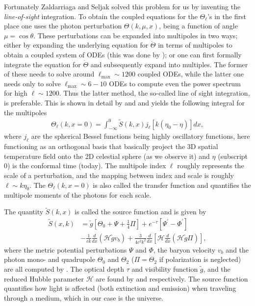 \documentclass[twocolumn]{aastex62}
\begin{document}
Fortunately Zaldarriaga and Seljak solved this problem for us by inventing the \textit{line-of-sight} integration. To obtain the coupled equations for the $ \Theta_\ell$'s in the first place one uses the photon perturbation $\Theta(k, \mu, x)$, being a function of angle $\mu = \cos \theta$. These perturbations can be expanded into multipoles in two ways; either by expanding the underlying equation for $\dot{\Theta}$ in terms of multipoles to obtain a coupled system of ODEs (this was done by \cite{stutzer:2020c}); or one can first formally integrate the equation for $\dot{\Theta}$ and subsequently expand into multiples. The former of these needs to solve around $\ell_\text{max}\sim 1200$ coupled ODEs, while the latter one needs only to solve $\ell_\text{max}\sim 6-10$ ODEs to compute even the power spectrum for high $\ell\sim 1200$. Thus the latter method, the so-called line of sight integration, is preferable. This is shown in detail by \cite{callin:2006} and \cite{dodelson:2003} and yields the following integral for the multipoles 
\begin{align}
    \Theta_\ell(k, x=0) = \int_{-\infty}^{0} \tilde{S}(k,x)
              j_\ell[k(\eta_0-\eta)] dx,
    \label{eq:transfer}
\end{align} 
where $j_\ell$ are the spherical Bessel functions being highly oscillatory functions, here functioning as an orthogonal basis that basically project the 3D spatial temperature field onto the 2D celestial sphere (as we observe it) and $\eta$ (subscript 0) is the conformal time (today). The multipole index $\ell$ roughly represents the scale of a perturbation, and the mapping between index and scale is roughly $\ell\sim k\eta_0$. The $\Theta_\ell(k, x = 0)$ is also called the transfer function and quantifies the multipole moments of the photons for each scale.

The quantity $\tilde{S}(k,x)$ is called the source function and is given by
\begin{align}
    \tilde{S}(x, k) &= \tilde{g}\left[ \Theta_0 + \Psi + \frac{1}{4}\Pi\right] + e^{-\tau} \left[\Psi^\prime-\Phi^\prime\right] \nonumber\\
    &- \frac{1}{ck}\frac{d}{dx}(\mathcal{H}\tilde{g}v_b) + \frac{3}{4c^2k^2} \frac{d}{dx} \left[\mathcal{H}\frac{d}{dx} (\mathcal{H}\tilde{g}\Pi)\right],
    \label{eq:source}
\end{align}
where the metric potential perturbations $\Psi$ and $\Phi$, the baryon velocity $v_b$ and the photon mono- and quadrupole $\Theta_0$ and $\Theta_2$ ($\Pi = \Theta_2$ if polarization is neglected) are all computed by \cite{stutzer:2020c}. The optical depth $\tau$ and visibility function $\tilde{g}$, and the reduced Hubble parameter $\mathcal{H}$ are found by \cite{stutzer:2020b} and \cite{stutzer:2020a} respectively. The source function quantifies how light is affected (both extinction and emission) when traveling through a medium, which in our case is the universe. 
\end{document}
